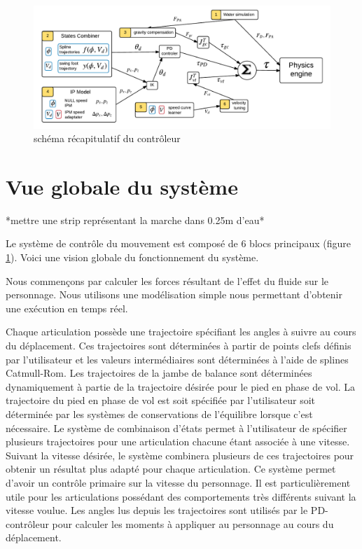 \documentclass{llncs}
\begin{document}
\begin{figure}[h]
\centering
\includegraphics[scale=0.6]{general_process.pdf}
\caption{schéma récapitulatif du contrôleur}
\label{fig:shema_controler}
\end{figure}

\section{Vue globale du système}
%

*mettre une strip représentant la marche dans 0.25m d'eau*

Le système de contrôle du mouvement est composé de 6 blocs principaux (figure \ref{fig:shema_controler}). Voici une vision globale du fonctionnement du système. 

Nous commençons par calculer les forces résultant de l'effet du fluide sur le personnage. Nous utilisons une modélisation simple nous permettant d'obtenir une exécution en temps réel.

Chaque articulation possède une trajectoire spécifiant les angles à suivre au cours du déplacement. Ces trajectoires sont déterminées à partir de points clefs définis par l'utilisateur et les valeurs intermédiaires sont déterminées à l'aide de splines Catmull-Rom. Les trajectoires de la jambe de balance sont déterminées dynamiquement à partie de la trajectoire désirée pour le pied en phase de vol. La trajectoire du pied en phase de vol est soit spécifiée par l'utilisateur soit déterminée par les systèmes de conservations de l'équilibre lorsque c'est nécessaire. Le système de combinaison d'états permet à l'utilisateur de spécifier plusieurs trajectoires pour une articulation chacune étant associée à une vitesse. Suivant la vitesse désirée, le système combinera plusieurs de ces trajectoires pour obtenir un résultat plus adapté pour chaque articulation. Ce système permet d'avoir un contrôle primaire sur la vitesse du personnage. Il est particulièrement utile pour les articulations possédant des comportements très différents suivant la vitesse voulue. Les angles lus depuis les trajectoires sont utilisés par le PD-contrôleur pour calculer les moments à appliquer au personnage au cours du déplacement.
\end{document}
